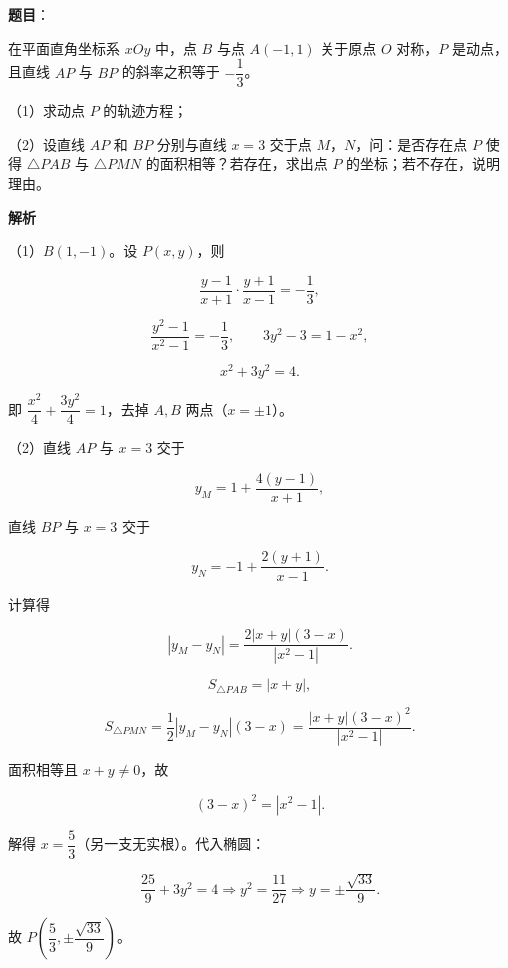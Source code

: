\begin{answer}

\textbf{题目}：

在平面直角坐标系 $xOy$ 中，点 $B$ 与点 $A(-1,1)$ 关于原点 $O$ 对称，$P$ 是动点，且直线 $AP$ 与 $BP$ 的斜率之积等于 $-\dfrac13$。

（1）求动点 $P$ 的轨迹方程；

（2）设直线 $AP$ 和 $BP$ 分别与直线 $x=3$ 交于点 $M$，$N$，问：是否存在点 $P$ 使得 $\triangle PAB$ 与 $\triangle PMN$ 的面积相等？若存在，求出点 $P$ 的坐标；若不存在，说明理由。
\nopagebreak[4]
\begin{center}\end{center}
\nopagebreak[4]
\textbf{解析}

（1）$B(1,-1)$。设 $P(x,y)$，则

\nopagebreak[4]
\[\frac{y-1}{x+1}\cdot\frac{y+1}{x-1}=-\frac13,\]

\nopagebreak[4]
\[\frac{y^2-1}{x^2-1}=-\frac13,\qquad 3y^2-3=1-x^2,\]

\nopagebreak[4]
\[x^2+3y^2=4.\]

即 $\dfrac{x^2}4+\dfrac{3y^2}4=1$，去掉 $A,B$ 两点（$x=\pm1$）。

（2）直线 $AP$ 与 $x=3$ 交于

\nopagebreak[4]
\[y_M=1+\frac{4(y-1)}{x+1},\]

直线 $BP$ 与 $x=3$ 交于

\nopagebreak[4]
\[y_N=-1+\frac{2(y+1)}{x-1}.\]

计算得

\nopagebreak[4]
\[|y_M-y_N|=\frac{2|x+y|(3-x)}{|x^2-1|}.\]

\nopagebreak[4]
\[S_{\triangle PAB}=|x+y|,\]

\nopagebreak[4]
\[S_{\triangle PMN}=\frac12|y_M-y_N|(3-x)
=\frac{|x+y|(3-x)^2}{|x^2-1|}.\]

面积相等且 $x+y\neq0$，故

\nopagebreak[4]
\[(3-x)^2=|x^2-1|.\]

解得 $x=\dfrac53$（另一支无实根）。代入椭圆：

\nopagebreak[4]
\[\frac{25}9+3y^2=4\Longrightarrow y^2=\frac{11}{27}\Longrightarrow y=\pm\frac{\sqrt{33}}9.\]

故 $P\left(\dfrac53,\pm\dfrac{\sqrt{33}}9\right)$。


\end{answer}
